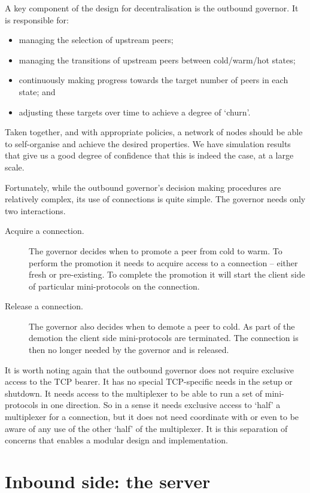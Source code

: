 A key component of the design for decentralisation is the outbound governor. It
is responsible for:
\begin{itemize}
\item managing the selection of upstream peers;
\item managing the transitions of upstream peers between cold/warm/hot states;
\item continuously making progress towards the target number of peers in each
      state; and
\item adjusting these targets over time to achieve a degree of `churn'.
\end{itemize}
Taken together, and with appropriate policies, a network of nodes should be
able to self-organise and achieve the desired properties. We have simulation
results that give us a good degree of confidence that this is indeed the case,
at a large scale.

Fortunately, while the outbound governor's decision making procedures are relatively
complex, its use of connections is quite simple. The governor needs only two
interactions.
\begin{description}
\item[Acquire a connection.] The governor decides when to promote a peer from
  cold to warm. To perform the promotion it needs to acquire access to a
  connection -- either fresh or pre-existing. To complete the promotion it will
  start the client side of particular mini-protocols on the connection.

\item[Release a connection.] The governor also decides when to demote a peer to
  cold. As part of the demotion the client side mini-protocols are terminated.
  The connection is then no longer needed by the governor and is released.
\end{description}

It is worth noting again that the outbound governor does not require exclusive
access to the TCP bearer. It has no special TCP-specific needs in the setup or
shutdown.
It needs access to the multiplexer to be able to run a set of
mini-protocols in one direction. So in a sense it needs exclusive access to
`half' a multiplexer for a connection, but it does not need coordinate with or
even to be aware of any use of the other `half' of the multiplexer. It is this
separation of concerns that enables a modular design and implementation.


\section{Inbound side: the server}

